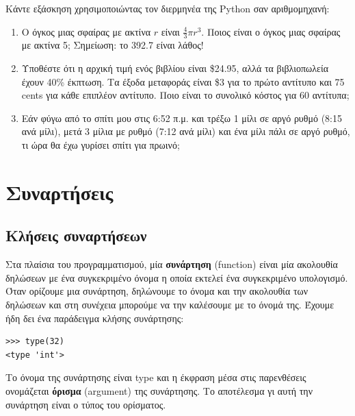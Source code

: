 \documentclass[10pt]{book}
\begin{document}
\begin{exercise}
Κάντε εξάσκηση χρησιμοποιώντας τον διερμηνέα της Python σαν
αριθμομηχανή:

\begin{enumerate}

\item Ο όγκος μιας σφαίρας με ακτίνα $r$ είναι $\frac{4}{3} \pi r^3$.  
	Ποιος είναι ο όγκος μιας σφαίρας με ακτίνα 5; Σημείωση: το 392.7 είναι
    λάθος!

\item  Υποθέστε ότι η αρχική τιμή ενός βιβλίου είναι \$24.95,  αλλά τα
	βιβλιοπωλεία έχουν 40\% έκπτωση. Τα έξοδα μεταφοράς είναι \$3 για το πρώτο
	αντίτυπο και 75 cents για κάθε επιπλέον αντίτυπο. Ποιο είναι το συνολικό
	κόστος για 60 αντίτυπα;  


\item Εάν φύγω από το σπίτι μου στις 6:52 π.μ. και τρέξω 1 μίλι σε
	αργό ρυθμό (8:15 ανά μίλι), μετά 3 μίλια με ρυθμό (7:12 ανά μίλι) και ένα
	μίλι πάλι σε αργό ρυθμό, τι ώρα θα έχω γυρίσει σπίτι για πρωινό; 

\end{enumerate}
\end{exercise}


\chapter{Συναρτήσεις}
\label{funcchap}

\section{Κλήσεις συναρτήσεων}
\label{functionchap}

Στα πλαίσια του προγραμματισμού, μία {\bf συνάρτηση} (function) είναι μία ακολουθία δηλώσεων με ένα συγκεκριμένο όνομα η οποία εκτελεί ένα συγκεκριμένο
υπολογισμό. Όταν ορίζουμε μια συνάρτηση, δηλώνουμε το όνομα και την ακολουθία των δηλώσεων και στη συνέχεια μπορούμε να την καλέσουμε με το όνομά της. Έχουμε ήδη δει ένα παράδειγμα κλήσης συνάρτησης:

\begin{verbatim}
>>> type(32)
<type 'int'>
\end{verbatim}
%

Το όνομα της συνάρτησης είναι type και η έκφραση μέσα στις παρενθέσεις
ονομάζεται {\bf όρισμα} (argument) της συνάρτησης. Το αποτέλεσμα γι αυτή την συνάρτηση είναι ο τύπος του ορίσματος.
\end{document}
